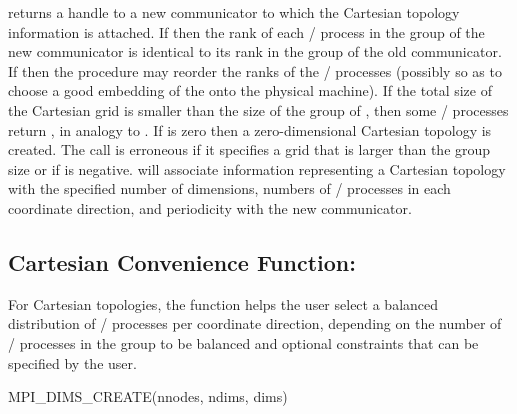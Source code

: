  returns a handle to a new communicator to which the
Cartesian topology information is attached.  If  then
the rank of each \MPI/ process in the group of the new communicator is identical
to its rank in the group of the old communicator.  If 
then the procedure may reorder the ranks of the \MPI/ processes (possibly so as to
choose a good embedding of the  onto the physical machine).
If the total size of the Cartesian grid is smaller than the size of the group
of , then some \MPI/ processes return , in
analogy to .
If  is zero then a zero-dimensional Cartesian topology is created. The
call is erroneous if it specifies a grid that is larger than the group size or if
 is negative.
 will associate information representing a Cartesian topology
with the specified number of dimensions, numbers of \MPI/ processes in each coordinate
direction, and periodicity with the new communicator.

\subsection{Cartesian Convenience Function: \texorpdfstring{}{MPI\_DIMS\_CREATE}}

For Cartesian topologies, the function  helps the user
select a balanced distribution of \MPI/ processes per coordinate direction,
depending on the number of \MPI/ processes in the group to be balanced and optional
constraints that can be specified by the user.

\begin{funcdef}{MPI\_DIMS\_CREATE}{(\mbox{nnodes}, \mbox{ndims}, \mbox{dims})}
\end{funcdef}

